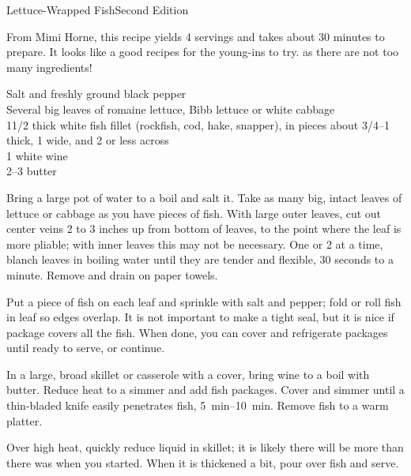 \begin{entry}{Lettuce-Wrapped Fish}{Second Edition}

\begin{open}
  From Mimi Horne, this recipe yields 4 servings and takes about 30 minutes to prepare. It looks like a good recipes for the young-ins to try. as there are not too many ingredients!
\end{open}
\begin{ingredients}
    Salt and freshly ground black pepper\\
    Several big leaves of romaine lettuce, Bibb lettuce or white cabbage\\
    1\SI{1/2}{\pound} thick white fish fillet (rockfish, cod, hake, snapper), in
    pieces about \SIrange[range-phrase={ to }]{3/4}{1}{\inch} thick,
    \SI{1}{\inch} wide, and \SI{2}{\inch} or less across\\
    \SI{1}{\cup} white wine\\
    \SIrange[range-phrase={ to }]{2}{3}{\tblspoon} butter
\end{ingredients}
Bring a large pot of water to a boil and salt it. Take as many big, intact
leaves of lettuce or cabbage as you have pieces of fish. With large outer
leaves, cut out center veins 2 to 3 inches up from bottom of leaves, to the
point where the leaf is more pliable; with inner leaves this may not be
necessary. One or 2 at a time, blanch leaves in boiling water until they are
tender and flexible, 30 seconds to a minute. Remove and drain on paper towels.

Put a piece of fish on each leaf and sprinkle with salt and pepper; fold or roll
fish in leaf so edges overlap. It is not important to make a tight seal, but it
is nice if package covers all the fish. When done, you can cover and refrigerate
packages until ready to serve, or continue.

In a large, broad skillet or casserole with a cover, bring wine to a boil with
butter. Reduce heat to a simmer and add fish packages. Cover and simmer until a
thin-bladed knife easily penetrates fish, \SIrange{5}{10}{\minute}. Remove fish
to a warm platter.

Over high heat, quickly reduce liquid in skillet; it is likely there will be
more than there was when you started. When it is thickened a bit, pour over fish
and serve.
\end{entry}


